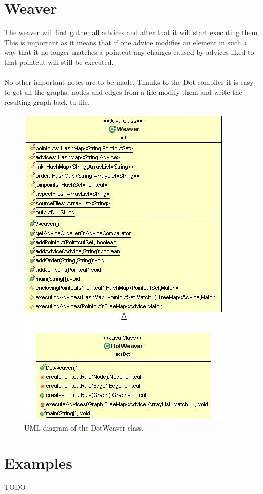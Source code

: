 \documentclass[a4paper]{report}
\begin{document}
\section{Weaver}
The weaver will first gather all advices and after that it will start executing them. This is important as it means that if one advice modifies an element in such a way that it no longer matches a pointcut any changes caused by advices liked to that pointcut will still be executed.\\
\\
No other important notes are to be made. Thanks to the Dot compiler it is easy to get all the graphs, nodes and edges from a file modify them and write the resulting graph back to file.\\
\begin{figure}
\centering
\includegraphics[scale=0.7]{images/AOFDot/DotWeaver.jpg}
\caption{UML diagram of the DotWeaver class.}
\label{fig:DotWeaver}
\end{figure}

\section{Examples}
TODO
\end{document}
